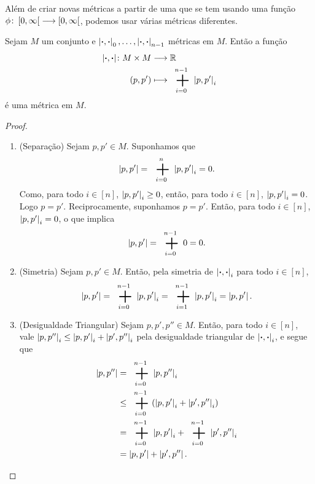 Além de criar novas métricas a partir de uma que se tem usando uma função $\phi\colon \allowbreak \left[0,\allowbreak \infty\right[ \longrightarrow \left[0,\allowbreak \infty\right[$, podemos usar várias métricas diferentes.

\begin{proposition}
Sejam $M$ um conjunto e $\left\vert{\bm{\cdot}},{\bm{\cdot}}\right\vert_0, \ldots, \left\vert{\bm{\cdot}},{\bm{\cdot}}\right\vert_{n-1}$ métricas em $M$. Então a função
	\begin{align*}
		\func{\dist{\var}{\var}}{M \times M}{\R}{(p,p')}{\sum_{i=0}^{n-1} \dist{p}{p'}_i}
	\end{align*}
é uma métrica em $M$.
\end{proposition}
\begin{proof}
	\begin{enumerate}
	\item (Separação) Sejam $p,p' \in M$. Suponhamos que
	\begin{equation*}
	\dist{p}{p'} = \sum_{i=0}^n \dist{p}{p'}_i = 0.
	\end{equation*}
Como, para todo $i \in [n]$, $\left\vert{p},{p'}\right\vert_i \geq 0$, então, para todo $i \in [n]$, $\left\vert{p},{p'}\right\vert_i = 0$. Logo $p=p'$. Reciprocamente, suponhamos $p=p'$. Então, para todo $i \in [n]$, $\left\vert{p},{p'}\right\vert_i=0$, o que implica
	\begin{equation*}
	\dist{p}{p'} = \sum_{i=0}^{n-1} 0 = 0.
	\end{equation*}

	\item (Simetria) Sejam $p,p' \in M$. Então, pela simetria de $\left\vert{\bm{\cdot}},{\bm{\cdot}}\right\vert_i$ para todo $i \in [n]$,
	\begin{equation*}
	\dist{p}{p'} = \sum_{i=0}^{n-1} \dist{p}{p'}_i = \sum_{i=1}^{n-1} \dist{p}{p'}_i = \dist{p}{p'}.
	\end{equation*}

	\item (Desigualdade Triangular) Sejam $p,p',p'' \in M$. Então, para todo $i \in [n]$, vale $\left\vert{p},{p''}\right\vert_i \leq \left\vert{p},{p'}\right\vert_i+\left\vert{p'},{p''}\right\vert_i$ pela desigualdade triangular de $\left\vert{\bm{\cdot}},{\bm{\cdot}}\right\vert_i$, e segue que
	\begin{align*}
	\dist{p}{p''} &= \sum_{i=0}^{n-1} \dist{p}{p''}_i \\
				&\leq \sum_{i=0}^{n-1} (\dist{p}{p'}_i+\dist{p'}{p''}_i) \\
				&= \sum_{i=0}^{n-1} \dist{p}{p'}_i + \sum_{i=0}^{n-1} \dist{p'}{p''}_i \\
				&= \dist{p}{p'}+\dist{p'}{p''}. \qedhere
	\end{align*}
	\end{enumerate}
\end{proof}

